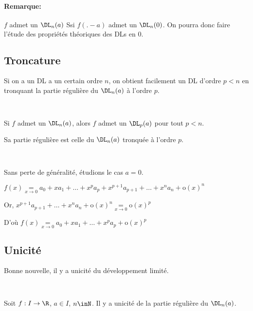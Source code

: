 \documentclass[12pt]{article}
\begin{document}
\paragraph{Remarque:}$f$ admet un $\DL_n(a)$ Ssi $f(.-a)$ admet un
$\DL_n(0)$. On pourra donc faire l'étude des propriétés théoriques des DLs
en $0$.

\subsection{Troncature}

Si on a un DL a un certain ordre $n$, on obtient facilement un DL d'ordre
$p<n$ en tronquant la partie régulière du $\DL_n(a)$ à l'ordre $p$.

\begin{Prop}~

Si $f$ admet un $\DL_n(a)$, alors $f$ admet un $\DL_p(a)$ pour tout $p<n$.

Sa partie régulière est celle du $\DL_n(a)$ tronquée à l'ordre $p$.


\end{Prop}


\begin{demo}~
  
Sans perte de généralité, étudions le cas $a=0$.

$f(x)\underset{x\rightarrow 0}{=} a_0 + x a_1 + \dots + x^p a_p + x^{p+1} a_{p+1} + \dots + x^n a_n  + \text{o}(x)^{n}$

Or, $x^{p+1} a_{p+1} + \dots + x^n a_n  + \text{o}(x)^{n}
\underset{x\rightarrow 0}{=} \text{o}(x)^{p}$

D'où $f(x) \underset{x\rightarrow 0}{=} a_0 + x a_1 + \dots + x^p a_p + \text{o}(x)^{p}$


\end{demo}



\subsection{Unicité}

Bonne nouvelle, il y a unicité du développement limité.

\begin{Theo}[Unicité du DL]~

Soit $f:I\rightarrow \R$, $a\in I$, $n\inN$. Il y a unicité de la partie
régulière du $\DL_n(a)$.

\end{Theo}
\end{document}

